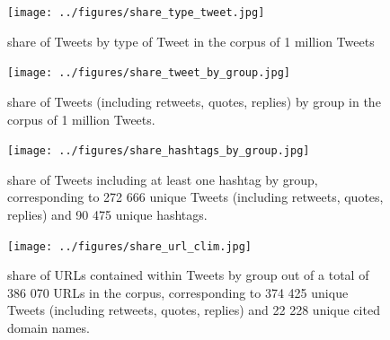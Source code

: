 \documentclass{article}
\begin{document}
\begin{figure}[ht] \label{ fig7} 
  \begin{minipage}[b]{0.4\linewidth}
  \centering
    \texttt{[image: ../figures/share\_type\_tweet.jpg]} 
    \caption{share of Tweets by type of Tweet in the corpus of 1 million Tweets} 
  \end{minipage} 
  \begin{minipage}[b]{0.4\linewidth}
  \centering
    \texttt{[image: ../figures/share\_tweet\_by\_group.jpg]} 
    \caption{share of Tweets (including retweets, quotes, replies) by group in the corpus of 1 million Tweets.} 
  \end{minipage} 
  \begin{minipage}[b]{0.4\linewidth}
  \centering
    \texttt{[image: ../figures/share\_hashtags\_by\_group.jpg]} 
    \caption{share of Tweets including at least one hashtag by group, corresponding to 272 666 unique Tweets (including retweets, quotes, replies) and 90 475 unique hashtags.} 
  \end{minipage}
  \hfill
  \hfill
  \begin{minipage}[b]{0.4\linewidth}
  \centering
    \texttt{[image: ../figures/share\_url\_clim.jpg]} 
    \caption{share of URLs contained within Tweets by group out of a total of 386 070 URLs in the corpus, corresponding to 374 425 unique Tweets (including retweets, quotes, replies) and 22 228 unique cited domain names.} 
  \end{minipage} 
\end{figure}

\end{document}
